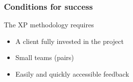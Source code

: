 \begin{frame}
    \frametitle{Conditions for success}
        \begin{block}
        The XP methodology requires            
            \begin{itemize}
                \item A client fully invested in the project
                \item Small teams (pairs)
                \item Easily and quickly accessible feedback
            \end{itemize}
        \end{block}
\end{frame}
